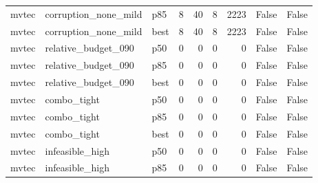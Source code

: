 \begin{tabular}{lllrrrrll}
   mvtec & corruption\_none\_mild &    p85 &                   8 &                40 &                    8 &                         2223 &                                        False &                                False \\
   mvtec & corruption\_none\_mild &   best &                   8 &                40 &                    8 &                         2223 &                                        False &                                False \\
   mvtec &  relative\_budget\_090 &    p50 &                   0 &                 0 &                    0 &                            0 &                                        False &                                False \\
   mvtec &  relative\_budget\_090 &    p85 &                   0 &                 0 &                    0 &                            0 &                                        False &                                False \\
   mvtec &  relative\_budget\_090 &   best &                   0 &                 0 &                    0 &                            0 &                                        False &                                False \\
   mvtec &          combo\_tight &    p50 &                   0 &                 0 &                    0 &                            0 &                                        False &                                False \\
   mvtec &          combo\_tight &    p85 &                   0 &                 0 &                    0 &                            0 &                                        False &                                False \\
   mvtec &          combo\_tight &   best &                   0 &                 0 &                    0 &                            0 &                                        False &                                False \\
   mvtec &      infeasible\_high &    p50 &                   0 &                 0 &                    0 &                            0 &                                        False &                                False \\
   mvtec &      infeasible\_high &    p85 &                   0 &                 0 &                    0 &                            0 &                                        False &                                False \\

\end{tabular}
